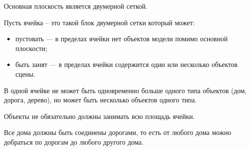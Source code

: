 Основная плоскость является двумерной сеткой.

Пусть ячейка -- это такой блок двумерной сетки который может:
\begin{itemize}
    \item пустовать --- в пределах ячейки нет объектов модели помимо основной плоскости;
    \item быть занят --- в пределах ячейки содержится один или несколько объектов сцены.
\end{itemize}

В одной ячейке не может быть одновременно больше одного типа объектов (дом, дорога, дерево), но может быть несколько объектов одного типа.

Объекты не обязательно должны занимать всю площадь ячейки.

Все дома должны быть соединены дорогами, то есть от любого дома можно добраться по дорогам до любого другого дома.
